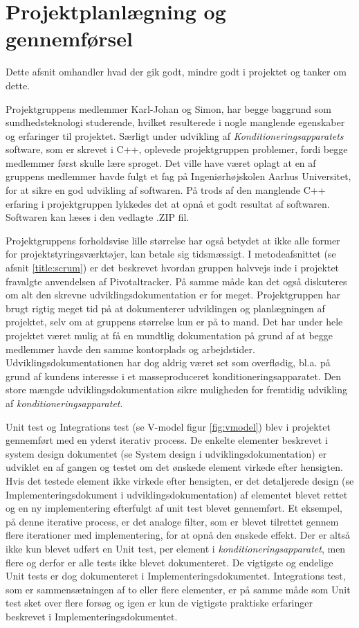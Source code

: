 \section{Projektplanlægning og gennemførsel}
Dette afsnit omhandler hvad der gik godt, mindre godt i projektet og tanker om dette.

Projektgruppens medlemmer Karl-Johan og Simon, har begge baggrund som sundhedsteknologi studerende, hvilket resulterede i nogle manglende egenskaber og erfaringer til projektet. Særligt under udvikling af \textit{Konditioneringsapparatets} software, som er skrevet i C++, oplevede projektgruppen problemer, fordi begge medlemmer først skulle lære sproget. Det ville have været oplagt at en af gruppens medlemmer havde fulgt et fag på Ingeniørhøjskolen Aarhus Universitet, for at sikre en god udvikling af softwaren. På trods af den manglende C++ erfaring i projektgruppen lykkedes det at opnå et godt resultat af softwaren. Softwaren kan læses i den vedlagte .ZIP fil.

Projektgruppens forholdsvise lille størrelse har også betydet at ikke alle former for projektstyringsværktøjer, kan betale sig tidsmæssigt. I metodeafsnittet (se afsnit \ref{title:scrum}) er det beskrevet hvordan gruppen halvvejs inde i projektet fravalgte anvendelsen af Pivotaltracker. På samme måde kan det også diskuteres om alt den skrevne udviklingsdokumentation er for meget. Projektgruppen har brugt rigtig meget tid på at dokumenterer udviklingen og planlægningen af projektet, selv om at gruppens størrelse kun er på to mand. Det har under hele projektet været mulig at få en mundtlig dokumentation på grund af at begge medlemmer havde den samme kontorplads og arbejdstider.
Udviklingsdokumentationen har dog aldrig været set som overflødig, bl.a. på grund af kundens interesse i et masseproduceret konditioneringsapparatet. Den store mængde udviklingsdokumentation sikre muligheden for fremtidig udvikling af \textit{konditioneringsapparatet}. 

Unit test og Integrations test (se V-model figur \ref{fig:vmodel}) blev i projektet gennemført med en yderst iterativ process. De enkelte elementer beskrevet i system design dokumentet (se System design i udviklingsdokumentation) er udviklet en af gangen og testet om det ønskede element virkede efter hensigten. Hvis det testede element ikke virkede efter hensigten, er det detaljerede design (se Implementeringsdokument i udviklingsdokumentation) af elementet blevet rettet og en ny implementering efterfulgt af unit test blevet gennemført. Et eksempel, på denne iterative process, er det analoge filter, som er blevet tilrettet gennem flere iterationer med implementering, for at opnå den ønskede effekt. Der er altså ikke kun blevet udført en Unit test, per element i \textit{konditioneringsapparatet}, men flere og derfor er alle tests ikke blevet dokumenteret. De vigtigste og endelige Unit tests er dog dokumenteret i Implementeringsdokumentet. Integrations test, som er sammensætningen af to eller flere elementer, er på samme måde som Unit test sket over flere forsøg og igen er kun de vigtigste praktiske erfaringer beskrevet i Implementeringsdokumentet.

